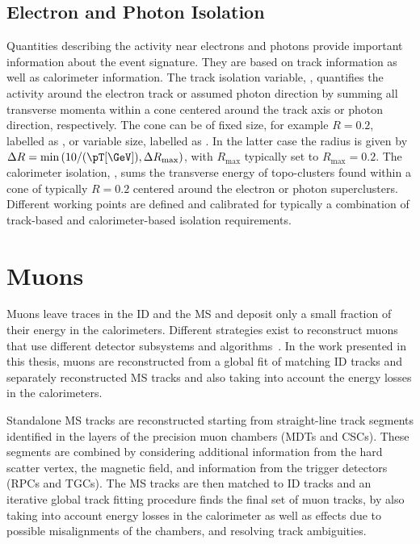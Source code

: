 \subsection{Electron and Photon Isolation}
Quantities describing the activity near electrons and photons provide important information about the event signature. They are based on track information as well as calorimeter information.
The track isolation variable, \pTcone, quantifies the activity around the electron track or assumed photon direction by summing all transverse momenta within a cone centered around the track axis or photon direction, respectively. The cone can be of fixed size, for example $R=0.2$, labelled as \pTconetwenty, or variable size, labelled as \pTvarcone. In the latter case the radius is given by $\Delta R = \text{min} \left( 10 / (\pT \text{[\GeV])}, \Delta R_{\text{max}}  \right)$, with $R_{\text{max}}$ typically set to $R_{\text{max}} = 0.2$.
The calorimeter isolation, \ETconetwenty, sums the transverse energy of topo-clusters found within a cone of typically $R=0.2$ centered around the electron or photon superclusters.
Different working points are defined and calibrated for typically a combination of track-based and calorimeter-based isolation requirements.


\section{Muons}
\label{sec:muon-reconstruction}
Muons leave traces in the ID and the MS and deposit only a small fraction of their energy in the calorimeters.
Different strategies exist to reconstruct muons that use different detector subsystems and algorithms~\cite{MUON-2018-03}.
In the work presented in this thesis, muons are reconstructed from a global fit of matching ID tracks and separately reconstructed MS tracks and also taking into account the energy losses in the calorimeters.

Standalone MS tracks are reconstructed starting from straight-line track segments identified in the layers of the precision muon chambers (MDTs and CSCs).
These segments are combined by considering additional information from the hard scatter vertex, the magnetic field, and information from the trigger detectors (RPCs and TGCs). The MS tracks are then matched to ID tracks and an iterative global track fitting procedure finds the final set of muon tracks, by also taking into account energy losses in the calorimeter as well as effects due to possible misalignments of the chambers, and resolving track ambiguities.

